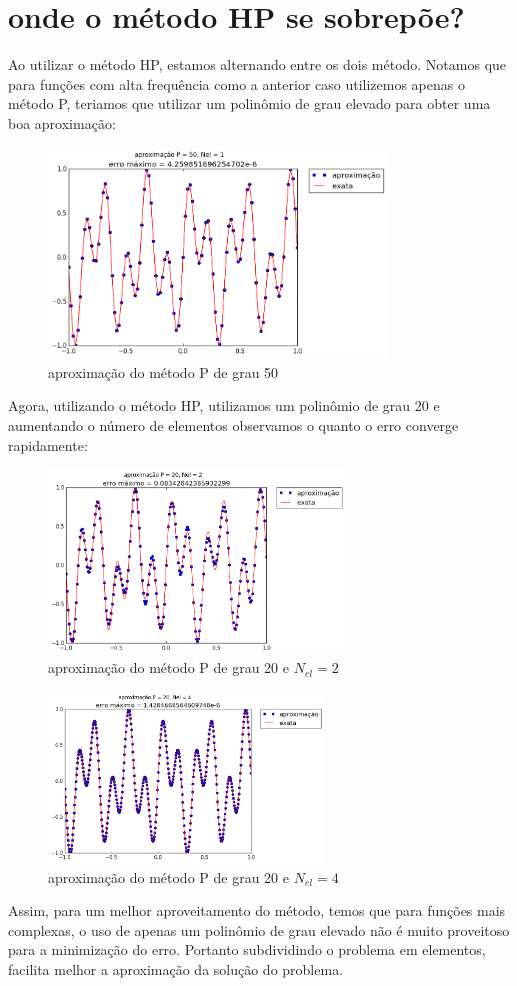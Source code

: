 \section{onde o método HP se sobrepõe?}
 Ao utilizar o método HP, estamos alternando entre os dois método. Notamos que para funções com alta frequência como a anterior caso utilizemos apenas o método P, teriamos que utilizar um polinômio de grau elevado para obter uma boa aproximação:
\begin{figure}[H]
\centering
\includegraphics[width=0.8\textwidth,center]{figuras/Neumm_1_50.png}
\caption{aproximação do método P de grau 50} 
\end{figure}
 Agora, utilizando o método HP, utilizamos um polinômio de grau 20 e aumentando o número de elementos observamos o quanto o erro converge rapidamente:\begin{figure}[H]
\centering
\includegraphics[width=0.7\textwidth,center]{figuras/Neumm_2_20.png}
\caption{aproximação do método P de grau 20 e $N_{el} = 2$} 
\end{figure}
\begin{figure}[H]
\centering
\includegraphics[width=0.65\textwidth,center]{figuras/Neumm_4_20.png}
\caption{aproximação do método P de grau 20 e $N_{el} = 4$} 
\end{figure}

Assim, para um melhor aproveitamento do método, temos que para funções mais complexas, o uso de apenas um polinômio de grau elevado não é muito proveitoso para a minimização  do erro. Portanto subdividindo o problema em elementos, facilita melhor a aproximação da solução do problema.